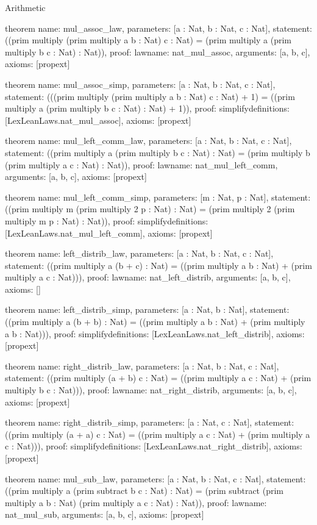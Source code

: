 \begin{lexlean}{Arithmetic}
\begin{semanticmodule}
theorem{
  name: mul_assoc_law,
  parameters: [a : Nat, b : Nat, c : Nat],
  statement: ((prim multiply (prim multiply a b : Nat) c : Nat) = (prim multiply a (prim multiply b c : Nat) : Nat)),
  proof: law{name: nat_mul_assoc, arguments: [a, b, c]},
  axioms: [propext]
}

theorem{
  name: mul_assoc_simp,
  parameters: [a : Nat, b : Nat, c : Nat],
  statement: (((prim multiply (prim multiply a b : Nat) c : Nat) + 1) = ((prim multiply a (prim multiply b c : Nat) : Nat) + 1)),
  proof: simplify{definitions: [LexLeanLaws.nat_mul_assoc]},
  axioms: [propext]
}

theorem{
  name: mul_left_comm_law,
  parameters: [a : Nat, b : Nat, c : Nat],
  statement: ((prim multiply a (prim multiply b c : Nat) : Nat) = (prim multiply b (prim multiply a c : Nat) : Nat)),
  proof: law{name: nat_mul_left_comm, arguments: [a, b, c]},
  axioms: [propext]
}

theorem{
  name: mul_left_comm_simp,
  parameters: [m : Nat, p : Nat],
  statement: ((prim multiply m (prim multiply 2 p : Nat) : Nat) = (prim multiply 2 (prim multiply m p : Nat) : Nat)),
  proof: simplify{definitions: [LexLeanLaws.nat_mul_left_comm]},
  axioms: [propext]
}

theorem{
  name: left_distrib_law,
  parameters: [a : Nat, b : Nat, c : Nat],
  statement: ((prim multiply a (b + c) : Nat) = ((prim multiply a b : Nat) + (prim multiply a c : Nat))),
  proof: law{name: nat_left_distrib, arguments: [a, b, c]},
  axioms: []
}

theorem{
  name: left_distrib_simp,
  parameters: [a : Nat, b : Nat],
  statement: ((prim multiply a (b + b) : Nat) = ((prim multiply a b : Nat) + (prim multiply a b : Nat))),
  proof: simplify{definitions: [LexLeanLaws.nat_left_distrib]},
  axioms: [propext]
}

theorem{
  name: right_distrib_law,
  parameters: [a : Nat, b : Nat, c : Nat],
  statement: ((prim multiply (a + b) c : Nat) = ((prim multiply a c : Nat) + (prim multiply b c : Nat))),
  proof: law{name: nat_right_distrib, arguments: [a, b, c]},
  axioms: [propext]
}

theorem{
  name: right_distrib_simp,
  parameters: [a : Nat, c : Nat],
  statement: ((prim multiply (a + a) c : Nat) = ((prim multiply a c : Nat) + (prim multiply a c : Nat))),
  proof: simplify{definitions: [LexLeanLaws.nat_right_distrib]},
  axioms: [propext]
}

theorem{
  name: mul_sub_law,
  parameters: [a : Nat, b : Nat, c : Nat],
  statement: ((prim multiply a (prim subtract b c : Nat) : Nat) = (prim subtract (prim multiply a b : Nat) (prim multiply a c : Nat) : Nat)),
  proof: law{name: nat_mul_sub, arguments: [a, b, c]},
  axioms: [propext]
}


\end{semanticmodule}
\end{lexlean}
